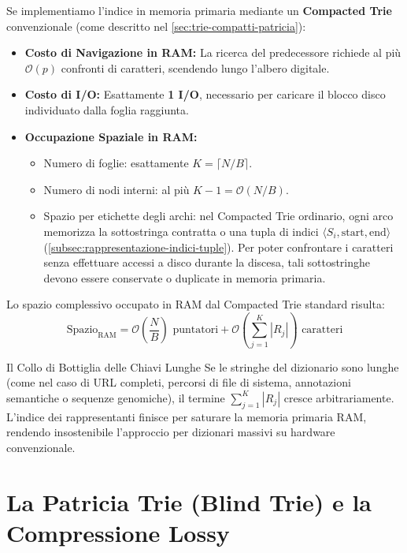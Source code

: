 Se implementiamo l'indice in memoria primaria mediante un \textbf{Compacted Trie} convenzionale (come descritto nel \autoref{sec:trie-compatti-patricia}):
\begin{itemize}
  \item \textbf{Costo di Navigazione in RAM:} La ricerca del predecessore richiede al pi\`u $\mathcal{O}(p)$ confronti di caratteri, scendendo lungo l'albero digitale.
  \item \textbf{Costo di I/O:} Esattamente \textbf{1 I/O}, necessario per caricare il blocco disco individuato dalla foglia raggiunta.
  \item \textbf{Occupazione Spaziale in RAM:}
  \begin{itemize}
    \item Numero di foglie: esattamente $K = \lceil N/B \rceil$.
    \item Numero di nodi interni: al pi\`u $K - 1 = \mathcal{O}(N/B)$.
    \item Spazio per etichette degli archi: nel Compacted Trie ordinario, ogni arco memorizza la sottostringa contratta o una tupla di indici $\langle S_i, \text{start}, \text{end} \rangle$ (\autoref{subsec:rappresentazione-indici-tuple}). Per poter confrontare i caratteri senza effettuare accessi a disco durante la discesa, tali sottostringhe devono essere conservate o duplicate in memoria primaria.
  \end{itemize}
\end{itemize}

Lo spazio complessivo occupato in RAM dal Compacted Trie standard risulta:
\begin{equation}
  \text{Spazio}_{\text{RAM}} = \mathcal{O}\left( \frac{N}{B} \right) \text{ puntatori} + \mathcal{O}\left( \sum_{j=1}^K |R_j| \right) \text{ caratteri}
\end{equation}

\begin{alertblock}{Il Collo di Bottiglia delle Chiavi Lunghe}
Se le stringhe del dizionario sono lunghe (come nel caso di URL completi, percorsi di file di sistema, annotazioni semantiche o sequenze genomiche), il termine $\sum_{j=1}^K |R_j|$ cresce arbitrariamente. L'indice dei rappresentanti finisce per saturare la memoria primaria RAM, rendendo insostenibile l'approccio per dizionari massivi su hardware convenzionale.
\end{alertblock}

\FloatBarrier
\section{La Patricia Trie (Blind Trie) e la Compressione Lossy}
\label{sec:patricia-blind-trie}

